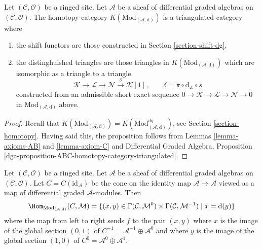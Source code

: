 \begin{proposition}
\label{proposition-homotopy-category-triangulated}
Let $(\mathcal{C}, \mathcal{O})$ be a ringed site.
Let $\mathcal{A}$ be a sheaf of differential graded algebras
on $(\mathcal{C}, \mathcal{O})$.
The homotopy category $K(\text{Mod}_{(\mathcal{A}, \text{d})})$
is a triangulated category where
\begin{enumerate}
\item the shift functors are those constructed in
Section \ref{section-shift-dg},
\item the distinghuished triangles are those triangles
in $K(\text{Mod}_{(\mathcal{A}, \text{d})})$ which are
isomorphic as a triangle to a triangle
$$
\mathcal{K} \to \mathcal{L} \to \mathcal{N}
\xrightarrow{\delta} \mathcal{K}[1],\quad\quad
\delta = \pi \circ \text{d}_\mathcal{L} \circ s
$$
constructed from an admissible short exact sequence
$0 \to \mathcal{K} \to \mathcal{L} \to \mathcal{N} \to 0$
in $\text{Mod}_{(\mathcal{A}, \text{d})}$ above.
\end{enumerate}
\end{proposition}

\begin{proof}
Recall that $K(\text{Mod}_{(\mathcal{A}, \text{d})}) =
K(\text{Mod}^{dg}_{(\mathcal{A}, \text{d})})$, see
Section \ref{section-homotopy}.
Having said this, the proposition
follows from Lemmas \ref{lemma-axioms-AB} and \ref{lemma-axiom-C}
and
Differential Graded Algebra, Proposition
\ref{dga-proposition-ABC-homotopy-category-triangulated}.
\end{proof}

\begin{remark}
\label{remark-cone-identity}
Let $(\mathcal{C}, \mathcal{O})$ be a ringed site.
Let $\mathcal{A}$ be a sheaf of differential graded algebras
on $(\mathcal{C}, \mathcal{O})$. Let $C = C(\text{id}_\mathcal{A})$
be the cone on the identity map $\mathcal{A} \to \mathcal{A}$ viewed
as a map of differential graded $\mathcal{A}$-modules.
Then
$$
\Hom_{\text{Mod}_{(\mathcal{A}, \text{d})}}(C, \mathcal{M}) =
\{(x, y) \in
\Gamma(\mathcal{C}, \mathcal{M}^0) \times
\Gamma(\mathcal{C}, \mathcal{M}^{-1}) \mid
x = \text{d}(y)\}
$$
where the map from left to right sends $f$ to the pair $(x, y)$
where $x$ is the image of the global section $(0, 1)$ of
$C^{-1} = \mathcal{A}^{-1} \oplus \mathcal{A}^0$ and where
$y$ is the image of the global section $(1, 0)$ of
$C^0 = \mathcal{A}^0 \oplus \mathcal{A}^1$.
\end{remark}

